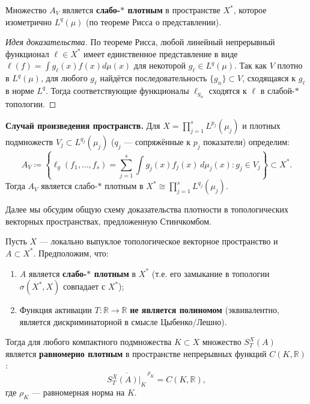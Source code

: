 \documentclass[../NDCNNAI_main.tex]{subfiles}
\begin{document}
\begin{lemma}
Множество $A_V$ является \textbf{слабо-$\ast$ плотным} в пространстве $X^*$, которое изометрично $L^q(\mu)$ (по теореме Рисса о представлении).
\end{lemma}

\begin{proof}[Идея доказательства]
По теореме Рисса, любой линейный непрерывный функционал $\ell \in X^*$ имеет единственное представление в виде $\ell(f) = \int g_\ell(x)f(x) d\mu(x)$ для некоторой $g_\ell \in L^q(\mu)$. Так как $V$ плотно в $L^q(\mu)$, для любого $g_\ell$ найдётся последовательность $\{g_n\} \subset V$, сходящаяся к $g_\ell$ в норме $L^q$. Тогда соответствующие функционалы $\ell_{g_n}$ сходятся к $\ell$ в слабой-$\ast$ топологии.
\end{proof}

\textbf{Случай произведения пространств.} Для $X = \prod_{j=1}^s L^{p_j}(\mu_j)$ и плотных подмножеств $V_j \subset L^{q_j}(\mu_j)$ ($q_j$ --- сопряжённые к $p_j$ показатели) определим:
\[
A_V \coloneq \left\{ \ell_g(f_1, \ldots, f_s) = \sum_{j=1}^s \int g_j(x)f_j(x) \, d\mu_j(x) : g_j \in V_j \right\} \subset X^*.
\]
Тогда $A_V$ является слабо-$\ast$ плотным в $X^* \cong \prod_{j=1}^s L^{q_j}(\mu_j)$.

Далее мы обсудим общую схему доказательства плотности в топологических векторных пространствах, предложенную Стинчкомбом.

\begin{theorem}
\label{thm:stinchcombe}
Пусть $X$ --- локально выпуклое топологическое векторное пространство и $A \subset X^*$. Предположим, что:
\begin{enumerate}
    \item $A$ является \textbf{слабо-$\ast$ плотным} в $X^*$ (т.е. его замыкание в топологии $\sigma(X^*, X)$ совпадает с $X^*$);
    \item Функция активации $T\colon \mathbb{R} \to \mathbb{R}$ \textbf{не является полиномом} (эквивалентно, является дискриминаторной в смысле Цыбенко/Лешно).
\end{enumerate}
Тогда для любого компактного подмножества $K \subset X$ множество $S_T^X(A)$ является \textbf{равномерно плотным} в пространстве непрерывных функций $C(K, \mathbb{R})$:
\[
\overline{S_T^X(A) \big|_K}^{\,\rho_K} = C(K, \mathbb{R}),
\]
где $\rho_K$ --- равномерная норма на $K$.
\end{theorem}
\end{document}
